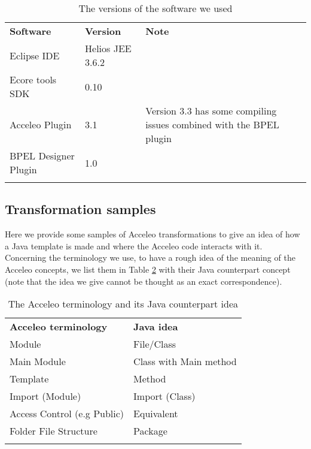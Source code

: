 \begin{table}
\caption{The versions of the software we used}
\label{tab:softwareVersions}
\begin{center}
\begin{tabular}{l l p{7cm}}
						\toprule
						\addlinespace[0.2cm]
\textbf{Software} 	& \textbf{Version} 	& \textbf{Note} 	\\ 
						\cmidrule(l){1-3}
Eclipse IDE 			& Helios JEE 3.6.2				& 	\\[0,1cm]		
Ecore tools SDK			& 0.10						&  	\\[0,1cm]
Acceleo Plugin			& 3.1						& Version 3.3 has some compiling issues combined with the BPEL plugin    	\\[0,1cm]
BPEL Designer Plugin 		& 1.0						&  	\\[0,1cm]

						\addlinespace[0.2cm]
						\bottomrule
\end{tabular}
\end{center}
\end{table}

\subsection{Transformation samples}
\label{sec:codeSamples}
Here we provide some samples of Acceleo transformations to give an idea of how a Java template is made and where the Acceleo code interacts with it. 
Concerning the terminology we use, to have a rough idea of the meaning of the Acceleo concepts, we list them in Table \ref{tab:terminology} with their Java counterpart concept (note that the idea we give cannot be thought as an exact correspondence).
\begin{table}[h!]
\caption{The Acceleo terminology and its Java counterpart idea}
\label{tab:terminology}
\begin{center}
\begin{tabular}{p{6cm} l} %
						\toprule
						\addlinespace[0.2cm]
\textbf{Acceleo terminology} 	& \textbf{Java idea} 	\\ 
						\cmidrule(l){1-2}
Module 				& File/Class				 	\\[0,1cm]		
Main Module			& Class with Main method		\\[0,1cm]
Template			& Method			  	\\[0,1cm]
Import (Module)			& Import (Class)			    	\\[0,1cm]
Access Control (e.g Public)	& Equivalent 					\\[0,1cm]
Folder File Structure		& Package				\\[0,1cm]

						\addlinespace[0.2cm]
						\bottomrule
\end{tabular}
\end{center}
\end{table}

